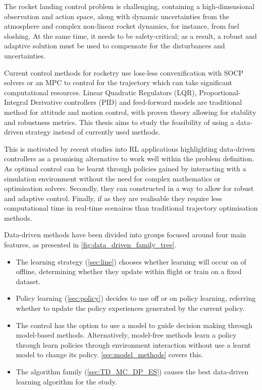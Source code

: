 The rocket landing control problem is challenging, containing a high-dimensional observation and action space, along with dynamic uncertainties from the atmosphere and complex non-linear rocket dynamics, for instance, from fuel sloshing. At the same time, it needs to be safety-critical; as a result, a robust and adaptive solution must be used to compensate for the disturbances and uncertainties.

Current control methods for rocketry use loss-less convexification with SOCP solvers or an MPC to control for the trajectory which can take significant computational resources. Linear Quadratic Regulators (LQR), Proportional-Integral Derivative controllers (PID) and feed-forward models are traditional method for attitude and motion control, with proven theory allowing for stability and robustness metrics. This thesis aims to study the feasibility of using a data-driven strategy instead of currently used methods.

This is motivated by recent studies into RL applications highlighting data-driven controllers as a promising alternative to work well within the problem definition. As optimal control can be learnt through policies gained by interacting with a simulation environment without the need for complex mathematics or optimisation solvers. Secondly, they can constructed in a way to allow for robust and adaptive control. Finally, if as they are realisable they require less computational time in real-time scenairos than traditional trajectory optimisation methods.

Data-driven methods have been divided into groups focused around four main features, as presented in \autoref{fig:data_driven_family_tree}.
\begin{itemize}
    \item The learning strategy (\autoref{sec:line}) chooses whether learning will occur on of offline, determining whether they update within flight or train on a fixed dataset.
    \item Policy learning (\autoref{sec:policy}) decides to use off or on policy learning, referring whether to update the policy experiences generated by the current policy.
    \item The control has the option to use a model to guide decision making through model-based methods. Alternatively, model-free methods learn a policy through learn policies through environment interaction without use a learnt model to change its policy. \autoref{sec:model_methods} covers this.
    \item The algorithm family (\autoref{sec:TD_MC_DP_ES}) causes the best data-driven learning algorithm for the study.
\end{itemize}

